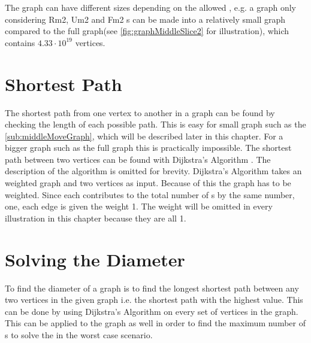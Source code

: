 The \rubik{} graph can have different sizes depending on the allowed \twist{}, e.g. a graph only considering Rm2, Um2 and Fm2 \twist{}s can be made into a relatively small graph compared to the full \rubik{} graph(see \ref{fig:graphMiddleSlice2} for illustration), which contains $4.33 \cdot 10^{19}$ vertices.


\section{Shortest Path}
The shortest path from one vertex to another in a graph can be found by checking the length of each possible path. 
This is easy for small graph such as the  \ref{sub:middleMoveGraph}, which will be described later in this chapter. For a bigger graph such as the full \rubik{} graph this is practically impossible. 
The shortest path between two vertices can be found with Dijkstra's Algorithm \cite[p. 651]{Rosen07}. The description of the algorithm is omitted for brevity. Dijkstra's Algorithm takes an weighted graph and two vertices as input. 
Because of this the \rubik{} graph has to be weighted. Since each \twist{} contributes to the total number of \twist{}s by the same number, one, each edge is given the weight 1. The weight will be omitted in every illustration in this chapter because they are all 1.  

\section{Solving the Diameter}
To find the diameter of a graph is to find the longest shortest path between any two vertices in the given graph i.e. the shortest path with the highest value. 
This can be done by using Dijkstra's Algorithm on every set of vertices in the graph. 
This can be applied to the \rubik{} graph as well in order to find the maximum number of \twist{}s to solve the \rubik{} in the worst case scenario. %


